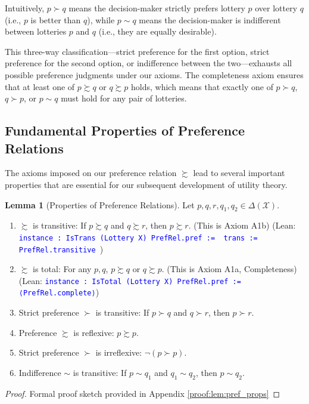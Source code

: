 \documentclass{article}
\theoremstyle{definition}
\newtheorem{lemma}[definition]{Lemma}
\newcommand{\X}{\mathcal{X}}
\newcommand{\tactic}[1]{\textcolor{blue}{\texttt{#1}}}
\newcommand{\DeltaX}{\Delta(\X)} %
\newcommand{\pref}{\succsim} %
\newcommand{\strictpref}{\succ} %
\newcommand{\indiff}{\sim} %
\begin{document}
Intuitively, $p \strictpref q$ means the decision-maker strictly prefers lottery $p$ over lottery $q$ (i.e., $p$ is better than $q$), while $p \indiff q$ means the decision-maker is indifferent between lotteries $p$ and $q$ (i.e., they are equally desirable).

This three-way classification—strict preference for the first option, strict preference for the second option, or indifference between the two—exhausts all possible preference judgments under our axioms. The completeness axiom ensures that at least one of $p \pref q$ or $q \pref p$ holds, which means that exactly one of $p \strictpref q$, $q \strictpref p$, or $p \indiff q$ must hold for any pair of lotteries.

\subsection{Fundamental Properties of Preference Relations}

The axioms imposed on our preference relation $\pref$ lead to several important properties that are essential for our subsequent development of utility theory.


\begin{lemma}[Properties of Preference Relations]\label{lem:pref_props}
Let $p, q, r, q_1, q_2 \in \DeltaX$.
\begin{enumerate}
    \item $\pref$ is transitive: If $p \pref q$ and $q \pref r$, then $p \pref r$. (This is Axiom A1b)
    (Lean: \tactic{instance : IsTrans (Lottery X) PrefRel.pref := { trans := PrefRel.transitive }})
    \item $\pref$ is total: For any $p, q$, $p \pref q$ or $q \pref p$. (This is Axiom A1a, Completeness)
    (Lean: \tactic{instance : IsTotal (Lottery X) PrefRel.pref := ⟨PrefRel.complete⟩})
    \item Strict preference $\strictpref$ is transitive: If $p \strictpref q$ and $q \strictpref r$, then $p \strictpref r$.
    \item Preference $\pref$ is reflexive: $p \pref p$.
    \item Strict preference $\strictpref$ is irreflexive: $\lnot(p \strictpref p)$.
    \item Indifference $\indiff$ is transitive: If $p \indiff q_1$ and $q_1 \indiff q_2$, then $p \indiff q_2$.
\end{enumerate}
\end{lemma}
\begin{proof}
Formal proof sketch provided in Appendix \ref{proof:lem:pref_props}
\end{proof}
\end{document}
